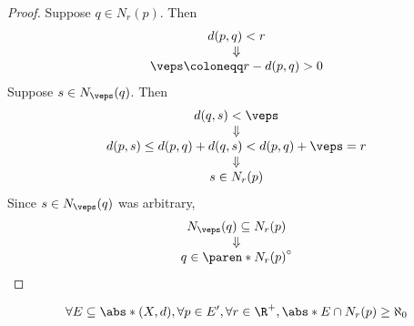 \begin{proof}
  Suppose $q \in N_{r}(p)$. Then
  \[
    \begin{array}{c}
      d(p, q) < r \\
      \Downarrow  \\
      \veps \coloneqq r - d(p, q) > 0
    \end{array}
  \]
  Suppose $s \in N_{\veps}(q)$. Then
  \[
    \begin{array}{c}
      d(q, s) < \veps                                      \\
      \Downarrow                                           \\
      d(p, s) \leq d(p, q) + d(q, s) < d(p, q) + \veps = r \\
      \Downarrow                                           \\
      s \in N_{r}(p)                                       \\
    \end{array}
  \]
  Since $s \in N_{\veps}(q)$ was arbitrary,
  \[
    \begin{array}{c}
      N_{\veps}(q) \subseteq N_{r}(p) \\
      \Downarrow                      \\
      q \in \paren*{N_{r}(p)}^{\circ}
    \end{array}
  \]
\end{proof}

\begin{theorem} \label{an1:thm:limit-point-neighborhood-contains-infinite-elements}
  \[
    \forall E \subseteq \abs*{(X, d)}, \forall p \in E', \forall r \in \R^{+}, \abs*{E \cap N_{r}(p)} \geq \aleph_{0}
  \]
\end{theorem}

